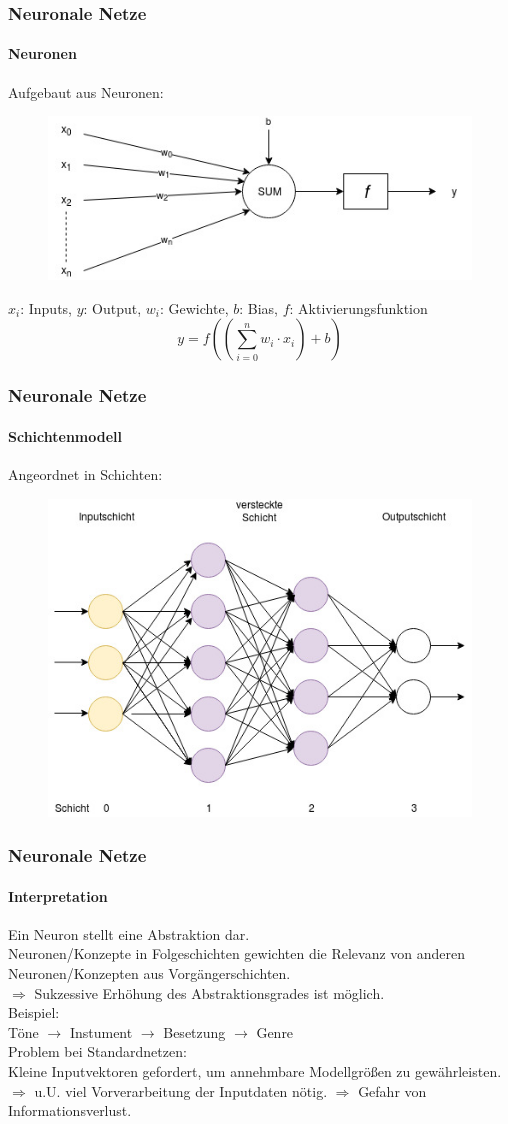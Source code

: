 \documentclass{beamer}
\begin{document}
\frame
{
	\frametitle{Neuronale Netze}
	\framesubtitle{Neuronen}
	Aufgebaut aus Neuronen:
 	\begin{figure}[h!]
		\centering
		\includegraphics[width=0.8\linewidth,height=0.8\textheight, keepaspectratio]{res/old/neuron.jpg}
	\end{figure}
	$x_i$: Inputs, $y$: Output, $w_i$: Gewichte, $b$: Bias, $f$: Aktivierungsfunktion
	$$y = f((\sum_{i=0}^{n}{w_i \cdot x_i}) + b)$$
}

\frame
{	
	\frametitle{Neuronale Netze}
	\framesubtitle{Schichtenmodell}
	Angeordnet in Schichten:
 	\begin{figure}[h!]
		\centering
		\includegraphics[width=0.8\linewidth,height=0.8\textheight, keepaspectratio]{res/old/Network.jpg}
	\end{figure}
}

\frame
{
	\frametitle{Neuronale Netze}
	\framesubtitle{Interpretation}
Ein Neuron stellt eine Abstraktion dar.\\
Neuronen/Konzepte in Folgeschichten gewichten die Relevanz von anderen Neuronen/Konzepten aus Vorgängerschichten.\\
$\Rightarrow$ Sukzessive Erhöhung des Abstraktionsgrades ist möglich.\\
Beispiel:\\
Töne $\rightarrow$ Instument $\rightarrow$ Besetzung $\rightarrow$ Genre\\
Problem bei Standardnetzen:\\
Kleine Inputvektoren gefordert, um annehmbare Modellgrößen zu gewährleisten.\\
$\Rightarrow$ u.U. viel Vorverarbeitung der Inputdaten nötig.
$\Rightarrow$ Gefahr von Informationsverlust.
}
\end{document}
